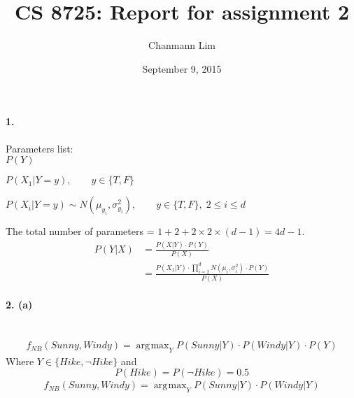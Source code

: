 \documentclass[a4paper]{article}
\DeclareMathOperator*{\argmax}{\arg\!\max}
\begin{document}
\title{CS 8725: Report for assignment 2}
\author{Chanmann Lim}
\date{September 9, 2015}
\maketitle

\paragraph{1.} Parameters list: \\

	$ P(Y) $
	
	$ P(X_1|Y = y), \qquad y \in \{T, F\} $
	
	$ P(X_i|Y = y) \sim N(\mu_{y_i}, \sigma_{y_i}^2), \qquad y \in \{T, F\}, \; 2 \leq i \leq d $
	
	The total number of parameters = $1 + 2 + 2 \times 2 \times (d-1) = 4d - 1 $.
	\begin{align}
		P(Y|X) &= \frac{P(X|Y) \cdot P(Y)}{P(X)} \\
			&= \frac{P(X_1|Y) \cdot \prod_{i=2}^d N(\mu_{i}, \sigma_{i}^2) \cdot P(Y)}{P(X)}
	\end{align} 

\paragraph{2. (a)} ~\\
	\begin{align}
		f_{NB}(Sunny, Windy) = \argmax_{Y} P(Sunny|Y) \cdot P(Windy|Y) \cdot P(Y)
	\end{align}
	Where $Y \in \{Hike, \neg Hike\}$ and 
	$$ P(Hike) = P(\neg Hike) = 0.5 $$
	\begin{align}
		f_{NB}(Sunny, Windy) = \argmax_{Y} P(Sunny|Y) \cdot P(Windy|Y)
	\end{align}
	
\end{document}
